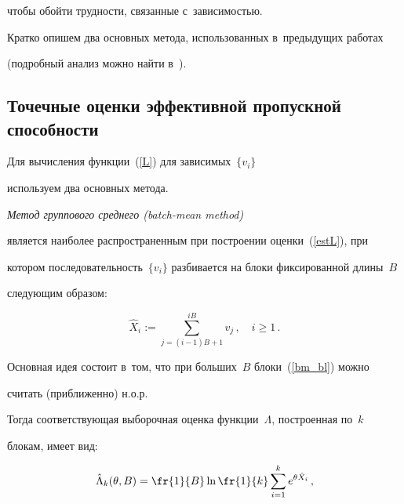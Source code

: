 чтобы обойти трудности, связанные с~зависимостью.


Кратко опишем  два основных метода, использованных в~предыдущих работах 


(подробный анализ можно найти в~\cite{Varna, smrlo, rudn, EB14}).





\subsection{Точечные оценки эффективной пропускной способности}





Для  вычисления  функции~(\ref{L}) для  зависимых~$\{v_i\}$ 


используем два основных метода.








{\it Метод группового среднего (batch-mean method)}~\cite{Varna, ICUMT, EB14} 


является  наиболее распространенным при  построении оценки~(\ref{estL}), при 


котором  последовательность~$\{v_i\}$ разбивается на блоки фиксированной длины~$B$ 


следующим образом:


\begin{equation}


\hat{X}_i:=\sum\limits_{j=(i-1)B+1}^{iB} v_j\,, \quad i \geqslant 1\,.


\label{bm_bl}


\end{equation}


Основная идея   состоит в~том, что при больших~$B$  блоки~(\ref{bm_bl}) можно 


считать (приближенно) н.о.р.


Тогда соответствующая выборочная оценка функции~$\Lambda$, построенная по~$k$ 


блокам, имеет вид:


\begin{equation*}


\hat{\Lambda}_k(\theta, B)=\fr{1}{B} \ln \fr{1}{k} \sum\limits_{i=1}^k e^{\theta 


\hat{X}_i}\,,




\end{equation*}


